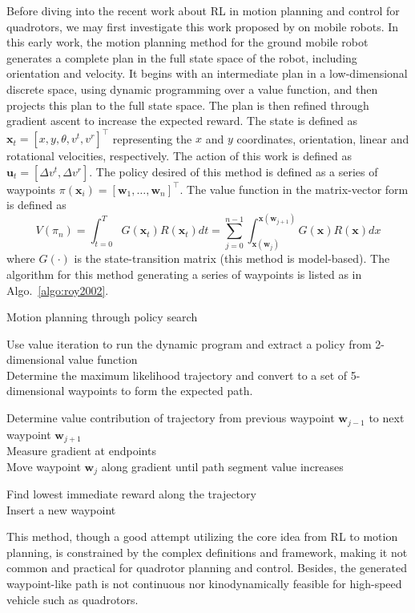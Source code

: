 \documentclass{article}
\newcommand{\B}[1]{\mathbf{#1}}
\begin{document}
Before diving into the recent work about RL in motion planning and 
control for quadrotors, we may first investigate this work proposed by 
\textcite{roy2002motion} on mobile robots.
In this early work, the motion planning method for the ground mobile robot 
generates a complete plan in the full state space of the robot, including orientation and velocity. 
It begins with an intermediate plan in a low-dimensional discrete space, using dynamic programming over a value function, and then projects this plan to the full state space. The plan is then refined through gradient ascent to increase the expected reward.
The state is defined as $\B{x}_t = \left[ x, y, \theta, v^t, v^r\right]^\top$ representing the $x$ and $y$ coordinates, orientation, linear 
and rotational velocities, respectively.
The action of this work is defined as $\B{u}_t = \left[ \Delta v^t, \Delta v^r \right]$.
The policy desired of this method is defined as a series 
of waypoints $\pi(\B{x}_i) = \left[ \B{w}_1, \dots, \B{w}_n\right]^\top$.
The value function in the matrix-vector form is defined as 
\[
  V(\pi_n) = \int_{t=0}^{T} G(\B{x}_t) R(\B{x}_t) dt 
           = \sum_{j=0}^{n-1} \int_{\B{x}(\B{w}_j)}^{\B{x}(\B{w}_{j+1})} G(\B{x}) R(\B{x}) dx 
\]
where $G(\cdot)$ is the state-transition matrix (this method
is model-based).
The algorithm for this method generating a series of waypoints is listed as in Algo.~\ref{algo:roy2002}.
\begin{algorithm}[h]
  \caption{Motion planning through policy search}
  \label{algo:roy2002}

  Use value iteration to run the dynamic program and extract a policy from 2-dimensional value function \\

  Determine the maximum likelihood trajectory and convert to a set of 5-dimensional waypoints to form the expected path. \\

  {
    \ForEach{Waypoint $\B{w}_j$}
    {
      Determine value contribution of trajectory from previous waypoint $\B{w}_{j-1}$ to next waypoint $\B{w}_{j+1}$ \\
      Measure gradient at endpoints \\
      Move waypoint $\B{w}_j$ along gradient until path segment value increases \\
    }

    Find lowest immediate reward along the trajectory \\
    Insert a new waypoint
  }
\end{algorithm}
This method, though a good attempt utilizing the core idea from RL to motion planning, 
is constrained by the complex definitions and framework, making
it not common and practical for quadrotor planning and control.
Besides, the generated waypoint-like path is not continuous nor 
kinodynamically feasible for high-speed vehicle such as quadrotors.
\end{document}
